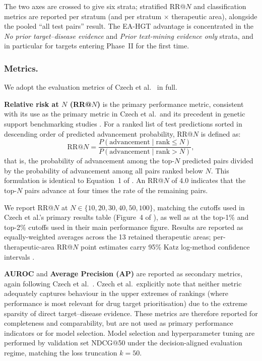 \documentclass[a4,center]{NAR}
\newcommand{\eahgt}{\textsc{EA-HGT}}
\begin{document}
{The two axes are crossed to give six strata; stratified RR@$N$ and
classification metrics are reported per stratum (and per stratum
$\times$ therapeutic area), alongside the pooled ``all test pairs''
result. The \eahgt{} advantage is concentrated in the
\emph{No prior target--disease evidence} and \emph{Prior text-mining
evidence only} strata, and in particular for targets entering
Phase~II for the first time.

\subsubsection{Metrics.}
\label{sec:metrics}

We adopt the evaluation metrics of Czech et al.\ \citep{Czech2024CLINICALFORECASTING} in full.

\textbf{Relative risk at $N$ (RR@$N$)} is the primary performance metric,
consistent with its use as the primary metric in Czech et al.\ and its
precedent in genetic support benchmarking studies
\citep{Nelson2015, King2019, Minikel2024}. For a ranked list of test
predictions sorted in descending order of predicted advancement probability,
RR@$N$ is defined as:
\begin{equation}
    \text{RR@}N =
    \frac{P(\text{advancement} \mid \text{rank} \leq N)}
         {P(\text{advancement} \mid \text{rank} > N)},
    \label{eq:rrn}
\end{equation}
that is, the probability of advancement among the top-$N$ predicted pairs
divided by the probability of advancement among all pairs ranked below $N$.
This formulation is identical to Equation~1 of \citet{Czech2024CLINICALFORECASTING}. An
RR@$N$ of 4.0 indicates that the top-$N$ pairs advance at four times the
rate of the remaining pairs.

We report RR@$N$ at $N \in \{10, 20, 30, 40, 50, 100\}$, matching the
cutoffs used in Czech et al.'s primary results table (Figure~4 of
\citet{Czech2024CLINICALFORECASTING}), as well as at the top-1\% and top-2\% cutoffs used
in their main performance figure. Results are reported as equally-weighted
averages across the 13 retained therapeutic areas; per-therapeutic-area
RR@$N$ point estimates carry 95\% Katz log-method confidence intervals
\citep{Katz1978ObtainingStudies}.

\textbf{AUROC} and \textbf{Average Precision (AP)} are reported as
secondary metrics, again following Czech et al.\ \citep{Czech2024CLINICALFORECASTING}. Czech
et al.\ explicitly note that neither metric adequately captures behaviour
in the upper extremes of rankings (where performance is most relevant
for drug target prioritisation) due to the extreme sparsity of
direct target--disease evidence. These metrics are therefore reported for
completeness and comparability, but are not used as primary performance
indicators or for model selection. Model selection and hyperparameter
tuning are performed by validation set NDCG@50 under the decision-aligned
evaluation regime, matching the loss truncation $k = 50$.

}
\end{document}
